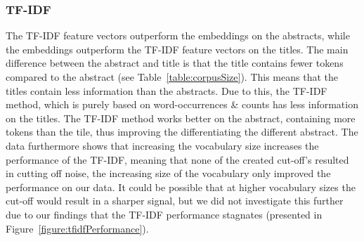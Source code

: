 \documentclass[runningheads]{llncs}
\begin{document}
\subsubsection{TF-IDF}
The TF-IDF feature vectors outperform the embeddings on the abstracts, while the embeddings outperform the TF-IDF feature vectors on the titles. The main difference between the abstract and title is that the title contains fewer tokens compared to the abstract (see Table~\ref{table:corpusSize}). This means that the titles contain less information than the abstracts. Due to this, the TF-IDF method, which is purely based on word-occurrences \& counts has less information on the titles. The TF-IDF method works better on the abstract, containing more tokens than the tile, thus improving the differentiating the different abstract. The data furthermore shows that increasing the vocabulary size increases the performance of the TF-IDF, meaning that none of the created cut-off's resulted in cutting off noise, the increasing size of the vocabulary only improved the performance on our data. It could be possible that at higher vocabulary sizes the cut-off would result in a sharper signal, but we did not investigate this further due to our findings that the TF-IDF performance stagnates (presented in Figure~\ref{figure:tfidfPerformance}).
\end{document}
